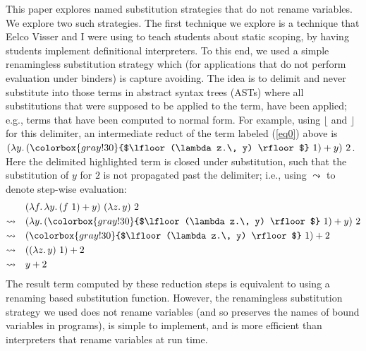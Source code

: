 This paper explores named substitution strategies that do not rename variables.
We explore two such strategies.
The first technique we explore is a technique that Eelco Visser and I were using to teach students about static scoping, by having students implement definitional interpreters.
To this end, we used a simple renamingless substitution strategy which (for applications that do not perform evaluation under binders) is capture avoiding.
The idea is to delimit and never substitute into those terms in abstract syntax trees (ASTs) where all substitutions that were supposed to be applied to the term, have been applied; e.g., terms that have been computed to normal form.
For example, using $\lfloor$ and $\rfloor$ for this delimiter, an intermediate reduct of the term labeled (\ref{eq0}) above is $(\lambda y.\, (\colorbox{gray!30}{$\lfloor (\lambda z.\, y) \rfloor$}\ 1) + y)\ 2$.
Here the delimited \colorbox{gray!30}{highlighted} term is closed under substitution, such that the substitution of $y$ for $2$ is not propagated past the delimiter; i.e., using $\leadsto$ to denote step-wise evaluation:
\begin{align*}
  & (\lambda f .\, \lambda y .\, (f\ 1) + y)\ (\lambda z .\, y)\ 2
  \\
  \leadsto\quad & (\lambda y.\, (\colorbox{gray!30}{$\lfloor (\lambda z.\, y) \rfloor$}\ 1) + y)\ 2
  \\
  \leadsto\quad & (\colorbox{gray!30}{$\lfloor (\lambda z.\, y) \rfloor$}\ 1) + 2
  \\
  \leadsto\quad & ((\lambda z.\, y)\ 1) + 2
  \\
  \leadsto\quad & y + 2
\end{align*}
%
The result term computed by these reduction steps is equivalent to using a renaming based substitution function.
However, the renamingless substitution strategy we used does not rename variables (and so preserves the names of bound variables in programs), is simple to implement, and is more efficient than interpreters that rename variables at run time.
